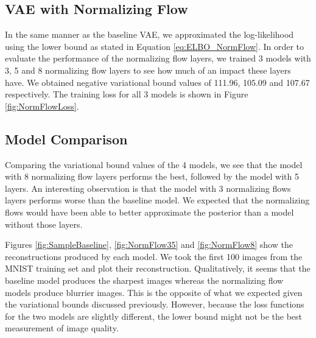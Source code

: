 \documentclass{article}
\begin{document}
\subsection{VAE with Normalizing Flow}
In the same manner as the baseline VAE, we approximated the log-likelihood using the lower bound
as stated in Equation \ref{eq:ELBO_NormFlow}. In order to evaluate the performance of the normalizing 
flow layers, we trained 3 models with 3, 5 and 8 normalizing flow layers to see how much of an impact 
these layers have. We obtained negative variational bound values of 111.96, 105.09 and 107.67 respectively.  
The training loss for all 3 models is shown in Figure \ref{fig:NormFlowLoss}.


\subsection{Model Comparison}
Comparing the variational bound values of the 4 models, we see that the model with 8 normalizing flow layers 
performs the best, followed by the model with 5 layers. An interesting observation is that the model with 
3 normalizing flows layers performs worse than the baseline model. We expected that the normalizing flows 
would have been able to better approximate the posterior than a model without those layers.

Figures \ref{fig:SampleBaseline}, \ref{fig:NormFlow35} and \ref{fig:NormFlow8} show the reconstructions 
produced by each model. We took the first 100 images from the MNIST training set and plot their reconstruction. 
Qualitatively, it seems that the baseline model produces the sharpest images whereas the normalizing flow 
models produce blurrier images. This is the opposite of what we expected given the variational bounds discussed
previously. However, because the loss functions for the two models are slightly different, the lower bound might 
not be the best measurement of image quality.
\end{document}
